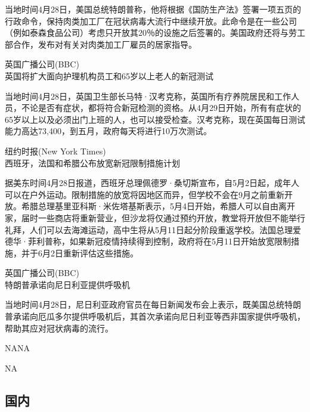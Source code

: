 \documentclass[
]{article}
\begin{document}
当地时间4月28日，美国总统特朗普称，他将根据《国防生产法》签署一项五页的行政命令，保持肉类加工厂在冠状病毒大流行中继续开放。此命令是在一些公司（例如泰森食品公司）考虑只开放其20％的设施之后签署的。美国政府还将与劳工部合作，发布对有关对肉类加工厂雇员的居家指导。

\begin{center}
\textcolor{glaucous}{英国广播公司(BBC)}\\英国将扩大面向护理机构员工和65岁以上老人的新冠测试
\end{center}

当地时间4月28日，英国卫生部长马特·汉考克称，英国所有疗养院居民和工作人员，不论是否有症状，都将符合新冠检测的资格。从4月29日开始，所有有症状的65岁以上以及必须出门上班的人，也可以接受检查。汉考克称，现在英国每日测试能力高达73,400，到五月，政府每天将进行10万次测试。

\begin{center}
\textcolor{glaucous}{纽约时报(New York Times)}\\西班牙，法国和希腊公布放宽新冠限制措施计划

\end{center}

据美东时间4月28日报道，西班牙总理佩德罗·桑切斯宣布，自5月2日起，成年人可以在户外运动。限制措施的放宽将因地区而异，但学校不会在9月之前重新开放。希腊总理基里亚科斯·米佐塔基斯表示，5月4日开始，希腊人可以自由离开家，届时一些商店将重新营业，但沙龙将仅通过预约开放，教堂将开放但不能举行礼拜，人们可以去海滩运动，高中生将从5月11日起分阶段重返学校。法国总理爱德华·菲利普称，如果新冠疫情持续得到控制，政府将在5月11日开始放宽限制措施，并于6月2日重新评估这些措施。

\begin{center}
\textcolor{glaucous}{英国广播公司(BBC)}\\特朗普承诺向尼日利亚提供呼吸机

\end{center}

当地时间4月28日，尼日利亚政府官员在每日新闻发布会上表示，既美国总统特朗普承诺向厄瓜多尔提供呼吸机后，其首次承诺向尼日利亚等西非国家提供呼吸机，帮助其应对冠状病毒的流行。

\begin{center}
\textcolor{glaucous}{NA}NA
\end{center}

NA

\vspace{5mm}

\hypertarget{section-1}{%
\subsection{\texorpdfstring{\textcolor{glaucous}{\Huge 国内}}{}}\label{section-1}}
\end{document}
